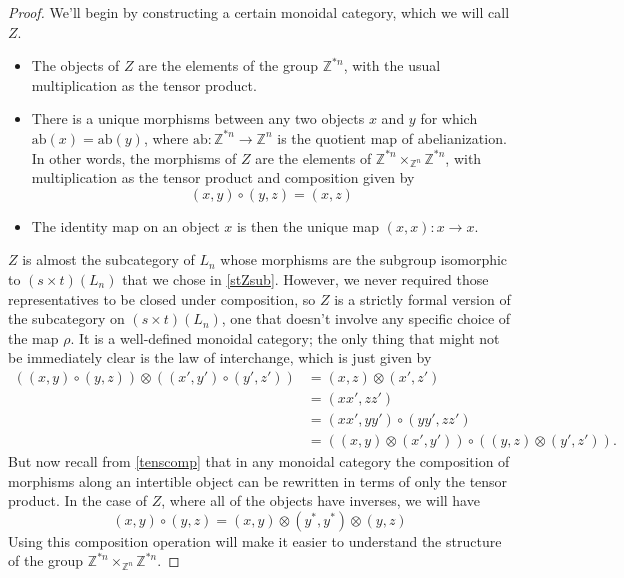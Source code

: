 \documentclass{amsbook} %
\newcommand{\ab}{\mathrm{ab}}
\numberwithin{section}{chapter}
\begin{document}
\begin{proof}
We'll begin by constructing a certain monoidal category, which we will call $Z$. 
\begin{itemize}
\item The objects of $Z$ are the elements of the group $\mathbb{Z}^{\ast n}$, with the usual multiplication as the tensor product.
\item There is a unique morphisms between any two objects $x$ and $y$ for which $\ab(x) = \ab(y)$, where $\ab \colon  \mathbb{Z}^{\ast n} \rightarrow \mathbb{Z}^n$ is the quotient map of abelianization. In other words, the morphisms of $Z$ are the elements of $\mathbb{Z}^{\ast n} \times_{\mathbb{Z}^n} \mathbb{Z}^{\ast n}$, with multiplication as the tensor product and composition given by
  \[
    (x,y) \circ (y,z)  =  (x, z)
  \]
\item The identity map on an object $x$ is then the unique map $(x,x) \colon x \rightarrow x$.
\end{itemize}
$Z$ is almost the subcategory of $L_n$ whose morphisms are the subgroup isomorphic to $(s \times t)(L_n)$ that we chose in \cref{stZsub}. However, we never required those representatives to be closed under composition, so $Z$ is a strictly formal version of the subcategory on $(s \times t)(L_n)$, one that doesn't involve any specific choice of the map $\rho$. It is a well-defined monoidal category; the only thing that might not be immediately clear is the law of interchange, which is just given by
  \begin{align*}
  	\left((x,y) \circ (y,z) \right) \otimes \left(  (x',y') \circ (y',z')  \right) &= (x,z) \otimes (x',z') \\
  	&= (xx',zz') \\
  	&= (xx',yy') \circ (yy',zz') \\
  	&= \left(  (x,y) \otimes (x',y')  \right) \circ \left(  (y,z) \otimes (y',z')  \right).
  \end{align*}
But now recall from \cref{tenscomp} that in any monoidal category the composition of morphisms along an intertible object can be rewritten in terms of only the tensor product. In the case of $Z$, where all of the objects have inverses, we will have
  \[
    (x,y) \circ (y, z)  =  (x, y) \otimes (y^*, y^*) \otimes (y, z)
  \]
Using this composition operation will make it easier to understand the structure of the group $\mathbb{Z}^{\ast n} \times_{\mathbb{Z}^n} \mathbb{Z}^{\ast n}$.


\end{proof}
\end{document}
